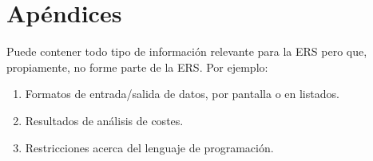 \documentclass[12pt,a4paper, twosite]{article}
\begin{document}
	\newpage
	
	
	\section{Apéndices}
	\label{sec:org75cea03}
	
	Puede contener todo tipo de información relevante para la ERS pero
	que, propiamente, no forme parte de la ERS. Por ejemplo:
	
	\begin{enumerate}
		\item Formatos de entrada/salida de datos, por pantalla o en listados.
		
		\item Resultados de análisis de costes.
		
		\item Restricciones acerca del lenguaje de programación.
	\end{enumerate}
\end{document}
